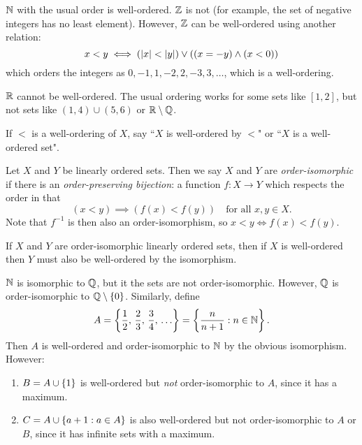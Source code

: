 \documentclass{article}
\begin{document}
\begin{example}
    $\mathbb{N}$ with the usual order is well-ordered. $\mathbb{Z}$ is not (for example, the set of negative integers has no least element). However, $\mathbb{Z}$ can be well-ordered using another relation:
    \[
	x < y \iff (\left\lvert x \right\rvert < \left\lvert y \right\rvert) \lor ((x = -y) \land (x<0))
	\]
	which orders the integers as $0, -1, 1, -2, 2, -3, 3, \dots$, which is a well-ordering.
	
	$\mathbb{R}$ cannot be well-ordered. The usual ordering works for some sets like $[1, 2]$, but not sets like $(1, 4) \cup (5, 6)$ or $\mathbb{R} \setminus \mathbb{Q}$.
\end{example}

\begin{note}
	If $<$ is a well-ordering of $X$,  say ``$X$ is well-ordered by $<$" or ``$X$ is a well-ordered set".
\end{note}

\begin{definition}
	\label{order-isomorphism}
    Let $X$ and $Y$ be linearly ordered sets. Then we say $X$ and $Y$ are \textit{order-isomorphic} if there is an \textit{order-preserving bijection}: a function $f : X \to Y$ which respects the order in that
    \[
	(x < y) \implies (f(x) < f(y)) \quad \text{for all $x, y \in X$}.
	\]
	Note that $f^{-1}$ is then also an order-isomorphism, so $x < y \iff f(x) < f(y)$.
\end{definition}

\begin{corollary}
    If $X$ and $Y$ are order-isomorphic linearly ordered sets, then if $X$ is well-ordered then $Y$ must also be well-ordered by the isomorphism.
\end{corollary}

\begin{example}
	\label{order-isomorphism-example}
    $\mathbb{N}$ is isomorphic to $\mathbb{Q}$, but it the sets are not order-isomorphic. However, $\mathbb{Q}$ is order-isomorphic to $\mathbb{Q} \setminus \left\lbrace 0 \right\rbrace$. Similarly, define
    \[
	A = \set{\frac{1}{2}, \, \frac{2}{3}, \, \frac{3}{4}, \, \dots } = \set{\frac{n}{n+1} : \ninn}.
	\]
	Then $A$ is well-ordered and order-isomorphic to $\mathbb{N}$ by the obvious isomorphism. However:
	\begin{enumerate}
    	\item $B = A \cup \left\lbrace 1 \right\rbrace$ is well-ordered but \textit{not} order-isomorphic to $A$, since it has a maximum.
    	\item $C = A \cup \left\lbrace a + 1: a \in A \right\rbrace$ is also well-ordered but not order-isomorphic to $A$ or $B$, since it has infinite sets with a maximum.
	\end{enumerate}
\end{example}
\end{document}
